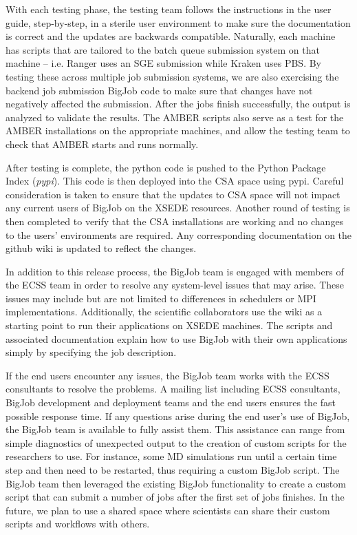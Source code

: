 \documentclass{sig-alternate}
\begin{document}
With each testing phase, the testing team follows the instructions in the user
guide, step-by-step, in a sterile user environment to make sure the
documentation is correct and the updates are backwards compatible.
Naturally, each machine has scripts that are tailored to the batch queue submission
system on that machine -- i.e. Ranger uses an SGE submission while Kraken uses
PBS. By testing these across multiple job submission systems, we are also
exercising the backend job submission BigJob code to make sure that changes have
not negatively affected the submission. After the jobs finish successfully, the
output is analyzed to validate the results. The AMBER scripts also serve as a
test for the AMBER installations on the appropriate machines, and allow the
testing team to check that AMBER starts and runs normally.

After testing is complete, the python code is pushed to the Python Package Index
(\textit{pypi}). This code is then deployed into the CSA space using pypi.
Careful consideration is taken to ensure that the updates to CSA space
will not impact any current users of BigJob on the XSEDE resources. Another round of testing 
is then completed to verify that the CSA installations are working and no changes to 
the users' environments are required. Any corresponding documentation on the 
github wiki is updated to reflect the changes.

In addition to this release process, the BigJob team is engaged with members
of the ECSS team in order to resolve any system-level issues that may arise.
These issues may include but are not limited to differences in schedulers or MPI
implementations. Additionally, the scientific collaborators use the wiki as a
starting point to run their applications on XSEDE machines. The scripts and
associated documentation explain how to use BigJob with their own applications
simply by specifying the job description. 

If the end users encounter any issues, the BigJob team works with the ECSS
consultants to resolve the problems. A mailing list including ECSS consultants,
BigJob development and deployment teams and the end users ensures the fast
possible response time. If any questions arise during the end user's use of
BigJob, the BigJob team is available to fully assist them. This assistance can
range from simple diagnostics of unexpected output to  the creation of
custom scripts for the researchers to use. For instance, some MD simulations
run until a certain time step and then need to be restarted, thus requiring a
custom BigJob script. The BigJob team then leveraged the existing BigJob
functionality to create a custom script that can submit a number of jobs after
the first set of jobs finishes. In the future, we plan to use a shared space
where scientists can share their custom scripts and workflows with others.
\end{document}
